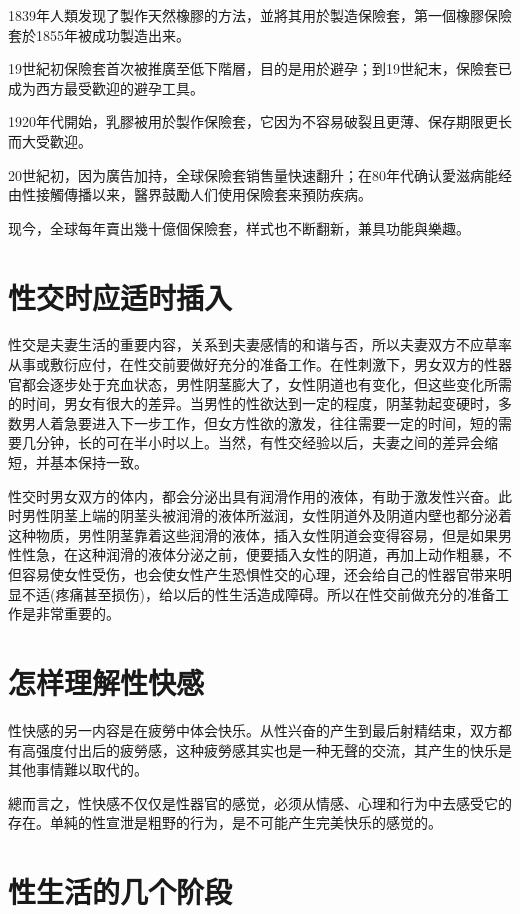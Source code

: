 \documentclass[12pt,UTF8]{ctexbook}
\begin{document}
1839年人類发现了製作天然橡膠的方法，並將其用於製造保險套，第一個橡膠保險套於1855年被成功製造出来。

19世紀初保險套首次被推廣至低下階層，目的是用於避孕；到19世紀末，保險套已成为西方最受歡迎的避孕工具。

1920年代開始，乳膠被用於製作保險套，它因为不容易破裂且更薄、保存期限更长而大受歡迎。

20世紀初，因为廣告加持，全球保險套销售量快速翻升；在80年代确认愛滋病能经由性接觸傳播以来，醫界鼓勵人们使用保險套来預防疾病。

现今，全球每年賣出幾十億個保險套，样式也不断翻新，兼具功能與樂趣。



\section{性交时应适时插入}

性交是夫妻生活的重要内容，关系到夫妻感情的和谐与否，所以夫妻双方不应草率从事或敷衍应付，在性交前要做好充分的准备工作。在性刺激下，男女双方的性器官都会逐步处于充血状态，男性阴茎膨大了，女性阴道也有变化，但这些变化所需的时间，男女有很大的差异。当男性的性欲达到一定的程度，阴茎勃起变硬时，多数男人着急要进入下一步工作，但女方性欲的激发，往往需要一定的时间，短的需要几分钟，长的可在半小时以上。当然，有性交经验以后，夫妻之间的差异会缩短，并基本保持一致。

性交时男女双方的体内，都会分泌出具有润滑作用的液体，有助于激发性兴奋。此时男性阴茎上端的阴茎头被润滑的液体所滋润，女性阴道外及阴道内壁也都分泌着这种物质，男性阴茎靠着这些润滑的液体，插入女性阴道会变得容易，但是如果男性性急，在这种润滑的液体分泌之前，便要插入女性的阴道，再加上动作粗暴，不但容易使女性受伤，也会使女性产生恐惧性交的心理，还会给自己的性器官带来明显不适(疼痛甚至损伤)，给以后的性生活造成障碍。所以在性交前做充分的准备工作是非常重要的。

\section{怎样理解性快感}

性快感的另一内容是在疲勞中体会快乐。从性兴奋的产生到最后射精结束，双方都有高强度付出后的疲勞感，这种疲勞感其实也是一种无聲的交流，其产生的快乐是其他事情難以取代的。

總而言之，性快感不仅仅是性器官的感觉，必须从情感、心理和行为中去感受它的存在。单純的性宣泄是粗野的行为，是不可能产生完美快乐的感觉的。

\section{性生活的几个阶段}
\end{document}
